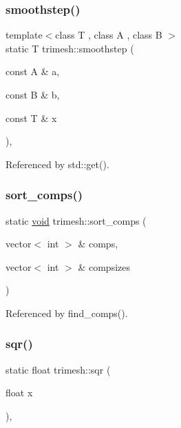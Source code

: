 \subsubsection{\texorpdfstring{smoothstep()}{smoothstep()}}
{\footnotesize\ttfamily template$<$class T , class A , class B $>$ \\
static T trimesh\+::smoothstep (\begin{DoxyParamCaption}\item[{const A \&}]{a,  }\item[{const B \&}]{b,  }\item[{const T \&}]{x }\end{DoxyParamCaption})\hspace{0.3cm}{\ttfamily [inline]}, {\ttfamily [static]}}



Referenced by std\+::get().

\mbox{\label{namespacetrimesh_ad01558b7bff16dfeed1475f5d59088d2}} 
\subsubsection{\texorpdfstring{sort\+\_\+comps()}{sort\_comps()}}
{\footnotesize\ttfamily static \hyperlink{namespacetrimesh_a784ddfd979e1c579bda795a8edfc3f43}{void} trimesh\+::sort\+\_\+comps (\begin{DoxyParamCaption}\item[{vector$<$ int $>$ \&}]{comps,  }\item[{vector$<$ int $>$ \&}]{compsizes }\end{DoxyParamCaption})\hspace{0.3cm}{\ttfamily [static]}}



Referenced by find\+\_\+comps().

\mbox{\label{namespacetrimesh_a6ae38b1b5675cb3ea6055da7c415614f}} 
\subsubsection{\texorpdfstring{sqr()}{sqr()}\hspace{0.1cm}{\footnotesize\ttfamily [1/2]}}
{\footnotesize\ttfamily static float trimesh\+::sqr (\begin{DoxyParamCaption}\item[{float}]{x }\end{DoxyParamCaption})\hspace{0.3cm}{\ttfamily [inline]}, {\ttfamily [static]}}



